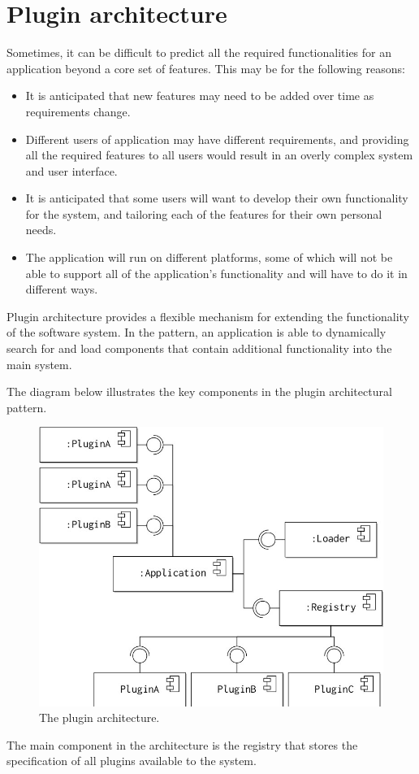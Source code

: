 \documentclass[a4paper, openany]{memoir}
\begin{document}
\section{Plugin architecture}
Sometimes, it can be difficult to predict all the required functionalities for an application beyond a core set of features. This may be for the following reasons:
\begin{itemize}
    \item It is anticipated that new features may need to be added over time as requirements change. 
    \item Different users of application may have different requirements, and providing all the required features to all users would result in an overly complex system and user interface.
    \item It is anticipated that some users will want to develop their own functionality for the system, and tailoring each of the features for their own personal needs.
    \item The application will run on different platforms, some of which will not be able to support all of the application's functionality and will have to do it in different ways.
\end{itemize}

Plugin architecture provides a flexible mechanism for extending the functionality of the software system. In the pattern, an application is able to dynamically search for and load components that contain additional functionality into the main system.

The diagram below illustrates the key components in the plugin architectural pattern.
\begin{figure}[H]
    \centering
    \includegraphics[scale=0.45]{src/14.20 plugin.png}
    \caption{The plugin architecture.}
\end{figure}
\noindent The main  component in the architecture is the registry that stores the specification of all plugins available to the system. 
\end{document}
